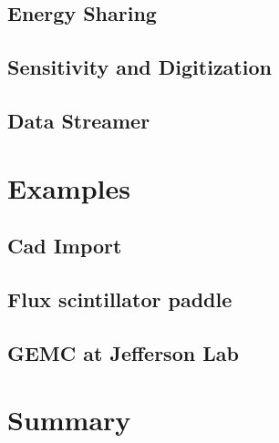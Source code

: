 \subsection{Energy Sharing}
\label{subsec:energy_sharing}

\subsection{Sensitivity and Digitization}
\label{subsec:digitization}



\subsection{Data Streamer}
\label{subsec:data_streamer}


\section{Examples}
\label{sec:examples}

\subsection{Cad Import}
\label{subsec:cad_import}

\subsection{Flux scintillator paddle}
\label{subsec:flux_scintillator_paddle}

\subsection{GEMC at Jefferson Lab}
\label{subsec:clas12}


\section{Summary}
\label{sec:summary}

